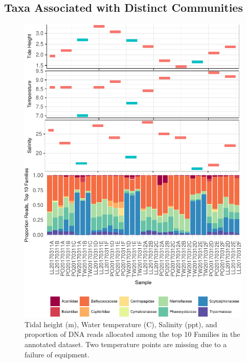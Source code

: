 \documentclass[fleqn,10pt,lineno]{wlpeerj} %
\begin{document}
\subsection{Taxa Associated with Distinct
Communities}\label{taxa-associated-with-distinct-communities}

\begin{figure}[!ht]

{\centering \includegraphics{figures/FIG6_multiplot_community_membership-1} 

}

\caption{\label{fig:fig6}Tidal height (m), Water temperature (C), Salinity (ppt), and proportion of DNA reads allocated among the top 10 Families in the annotated dataset. Two temperature points are missing due to a failure of equipment.}\label{fig:FIG6_multiplot_community_membership}
\end{figure}
\end{document}

